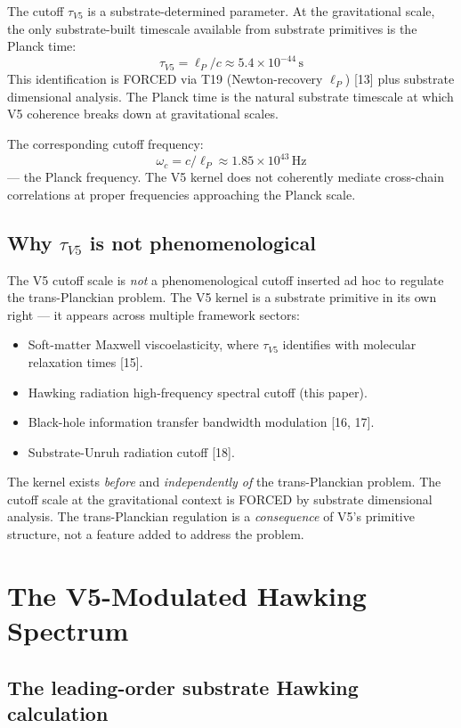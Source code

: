 \documentclass[11pt,a4paper]{article}
\begin{document}
The cutoff $\tau_{V5}$ is a substrate-determined parameter. At the gravitational scale, the only substrate-built timescale available from substrate primitives is the Planck time:
\[
\tau_{V5} = \ell_P/c \approx 5.4 \times 10^{-44}\, \mathrm{s}
\]
This identification is FORCED via T19 (Newton-recovery $\ell_P$) [13] plus substrate dimensional analysis. The Planck time is the natural substrate timescale at which V5 coherence breaks down at gravitational scales.

The corresponding cutoff frequency:
\[
\omega_c = c/\ell_P \approx 1.85 \times 10^{43}\, \mathrm{Hz}
\]
--- the Planck frequency. The V5 kernel does not coherently mediate cross-chain correlations at proper frequencies approaching the Planck scale.

\subsection{Why $\tau_{V5}$ is not phenomenological}

The V5 cutoff scale is \emph{not} a phenomenological cutoff inserted ad hoc to regulate the trans-Planckian problem. The V5 kernel is a substrate primitive in its own right --- it appears across multiple framework sectors:
\begin{itemize}[noitemsep]
\item Soft-matter Maxwell viscoelasticity, where $\tau_{V5}$ identifies with molecular relaxation times [15].
\item Hawking radiation high-frequency spectral cutoff (this paper).
\item Black-hole information transfer bandwidth modulation [16, 17].
\item Substrate-Unruh radiation cutoff [18].
\end{itemize}

The kernel exists \emph{before} and \emph{independently of} the trans-Planckian problem. The cutoff scale at the gravitational context is FORCED by substrate dimensional analysis. The trans-Planckian regulation is a \emph{consequence} of V5's primitive structure, not a feature added to address the problem.

\section{The V5-Modulated Hawking Spectrum}

\subsection{The leading-order substrate Hawking calculation}
\end{document}

